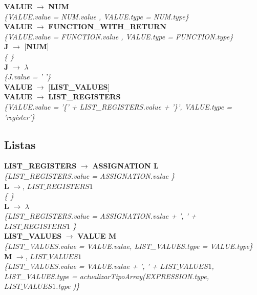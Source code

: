 \documentclass[10pt,a4paper]{article}
\begin{document}
\textbf{VALUE} $\rightarrow$ \textbf{NUM}   \\
\textit{\{VALUE.value =  NUM.value , VALUE.type = NUM.type\}} \\


\textbf{VALUE} $\rightarrow$ \textbf{FUNCTION\_WITH\_RETURN} \\
\textit{\{VALUE.value =  FUNCTION.value , VALUE.type = FUNCTION.type\}} \\

\textbf{J} $\rightarrow$ [\textbf{NUM}] \\
\textit{\{   \}} \\

\textbf{J} $\rightarrow$ $\lambda$   \\
\textit{\{J.value = ' '\}} \\

\textbf{VALUE} $\rightarrow$ [\textbf{LIST\_VALUES}]   \\

\textbf{VALUE} $\rightarrow$ \textbf{LIST\_REGISTERS} \\
\textit{\{VALUE.value =  '\{' + LIST\_REGISTERS.value + '\}', VALUE.type = 'register'\}} \\

\subsection{Listas}
\textbf{LIST\_REGISTERS} $\rightarrow$ \textbf{ASSIGNATION L} \\
\textit{\{LIST\_REGISTERS.value =  ASSIGNATION.value \}} \\

\textbf{L} $\rightarrow$, \textbf{$LIST\_REGISTERS{1}$} \\
\textit{\{   \}} \\

\textbf{L} $\rightarrow$ $\lambda$\\
\textit{\{LIST\_REGISTERS.value =  ASSIGNATION.value + ', ' + $LIST\_REGISTERS{1}$ \}}  \\ 

\textbf{LIST\_VALUES} $\rightarrow$ \textbf{VALUE M} \\
\textit{\{LIST\_VALUES.value =  VALUE.value, LIST\_VALUES.type = VALUE.type\}} \\

\textbf{M} $\rightarrow$, \textbf{$LIST\_VALUES{1}$} \\
\textit{\{LIST\_VALUES.value =  VALUE.value + ', ' + $LIST\_VALUES{1}$, LIST\_VALUES.type = actualizarTipoArray(EXPRESSION.type, $LIST\_VALUES{1}$.type )\}} \\
\end{document}
